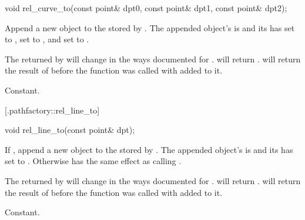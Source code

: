%
%
\begin{itemdecl}
void rel_curve_to(const point& dpt0, const point& dpt1, const point& dpt2);
\end{itemdecl}
\begin{itemdescr}
	\pnum
	\effects
	Append a new  object to the  stored by 
	. The appended object's  is 
	 and its  has 
	 set to , 
	 set to , and 
	 set to .
	
	\pnum
	\postcondition
	The  returned by  will change 
	in the ways documented for .
	 will return .
	 will return the result of 
	 before the function was called with 
	 added to it.
	
	\pnum
	\complexity
	Constant.
\end{itemdescr}

 [\iotwod.pathfactory::rel_line_to] {}

%
%
\begin{itemdecl}
void rel_line_to(const point& dpt);
\end{itemdecl}
\begin{itemdescr}
	\pnum
	\effects
	If , append a new  
	object to the  stored by . The appended 
	object's  is  and 
	its  has  set to 
	. Otherwise has the same effect as calling .
	
	\pnum
	\postconditions
	The  returned by  will change 
	in the ways documented for .
	 will return . 
	 will return the result of 
	 before the function was called with 
	 added to it.
	
	\pnum
	\complexity
	Constant.
\end{itemdescr}

